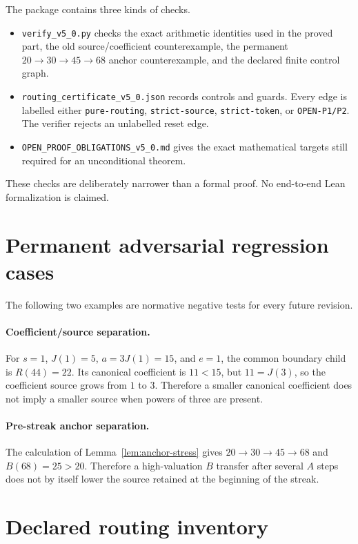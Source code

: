 The package contains three kinds of checks.
\begin{itemize}[leftmargin=*]
\item \texttt{verify\_v5\_0.py} checks the exact arithmetic identities used in
the proved part, the old source/coefficient counterexample, the permanent
$20\to30\to45\to68$ anchor counterexample, and the declared finite control
graph.
\item \texttt{routing\_certificate\_v5\_0.json} records controls and guards.
Every edge is labelled either \texttt{pure-routing}, \texttt{strict-source},
\texttt{strict-token}, or \texttt{OPEN-P1/P2}.  The verifier rejects an
unlabelled reset edge.
\item \texttt{OPEN\_PROOF\_OBLIGATIONS\_v5\_0.md} gives the exact mathematical
targets still required for an unconditional theorem.
\end{itemize}

These checks are deliberately narrower than a formal proof.  No end-to-end
Lean formalization is claimed.

\appendix
\section{Permanent adversarial regression cases}\label{app:regressions}

The following two examples are normative negative tests for every future
revision.

\paragraph{Coefficient/source separation.}
For $s=1$, $J(1)=5$, $a=3J(1)=15$, and $e=1$, the common boundary child is
$R(44)=22$.  Its canonical coefficient is $11<15$, but $11=J(3)$, so the
coefficient source grows from $1$ to $3$.  Therefore a smaller canonical
coefficient does not imply a smaller source when powers of three are present.

\paragraph{Pre-streak anchor separation.}
The calculation of Lemma~\ref{lem:anchor-stress} gives
$20\to30\to45\to68$ and $B(68)=25>20$.  Therefore a high-valuation $B$
transfer after several $A$ steps does not by itself lower the source retained
at the beginning of the streak.

\section{Declared routing inventory}\label{app:routing}

